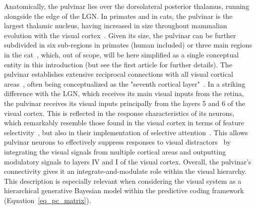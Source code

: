 Anatomically, the pulvinar lies over the dorsolateral posterior thalamus, running alongside the edge of the \gls{LGN}. In primates and in cats, the pulvinar is the largest thalamic nucleus, having increased in size throughout mammalian evolution with the visual cortex~\cite{hutchins1989retinotopic}. Given its size, the pulvinar can be further subdivided in six sub-regions in primates (human included) or three main regions in the cat~\cite{arcaro2015anatomical}, which, out of scope, will be here simplified as a single conceptual entity in this introduction (but see the first article for further details). The pulvinar establishes extensive reciprocal connections with all visual cortical areas~\cite{jones2012thalamus}, often being conceptualized as the "seventh cortical layer"~\cite{shipp2003functional}. In a striking difference with the \gls{LGN}, which receives its main visual inputs from the retina, the pulvinar receives its visual inputs principally from the layers 5 and 6 of the visual cortex. This is reflected in the response characteristics of its neurons, which remarkably resemble those found in the visual cortex in terms of feature selectivity~\cite{merabet1998motion}, but also in their implementation of selective attention~\cite{werner2004visual,villeneuve2012pattern}. This allows pulvinar neurons to effectively suppress responses to visual distractors~\cite{robinson1992pulvinar} by integrating the visual signals from multiple cortical areas and outputting modulatory signals to layers IV and I of the visual cortex. Overall, the pulvinar’s connectivity gives it an integrate-and-modulate role within the visual hierarchy. This description is especially relevant when considering the visual system as a hierarchical generative Bayesian model within the predictive coding framework (Equation~\ref{eq_pc_matrix}).

